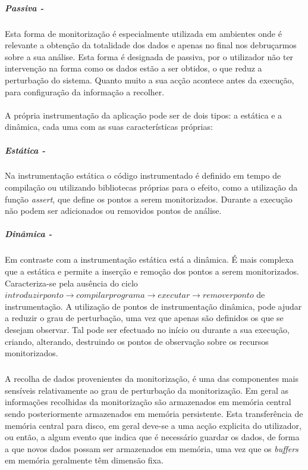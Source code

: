 \subparagraph*{Passiva - }
Esta forma de monitorização é especialmente utilizada em ambientes onde é relevante a obtenção da totalidade dos dados e apenas no final nos debruçarmos sobre a sua análise.
Esta forma é designada de passiva, por o utilizador não ter intervenção na forma como os dados estão a ser obtidos, o que reduz a perturbação do sistema.
Quanto muito a sua acção acontece antes da execução, para configuração da informação a recolher.

\paragraph*{}
A própria instrumentação da aplicação pode ser de dois tipos: a estática e a dinâmica, cada uma com as suas características próprias:

\subparagraph*{Estática - }

Na instrumentação estática o código instrumentado é definido em tempo de compilação ou utilizando bibliotecas próprias para o efeito, como a utilização da função \textit{assert}, que define os pontos a serem monitorizados.
Durante a execução não podem ser adicionados ou removidos pontos de análise.

\subparagraph*{Dinâmica - }

Em contraste com a instrumentação estática está a dinâmica.
É mais complexa que a estática e permite a inserção e remoção dos pontos a serem monitorizados.
Caracteriza-se pela ausência do ciclo $introduzir ponto\rightarrow compilar programa\rightarrow executar\rightarrow remover ponto$ de instrumentação.
A utilização de pontos de instrumentação dinâmica, pode ajudar a reduzir o grau de perturbação, uma vez que apenas são definidos os que se desejam observar.
Tal pode ser efectuado no início ou durante a sua execução, criando, alterando, destruindo os pontos de observação sobre os recursos monitorizados.


\subparagraph*{
}
A recolha de dados provenientes da monitorização, é uma das componentes mais sensíveis relativamente ao grau de perturbação da monitorização.
Em geral as informações recolhidas da monitorização são armazenados em memória central sendo posteriormente armazenados em memória persistente.
Esta transferência de memória central para disco, em geral deve-se a uma acção explicita do utilizador, ou então, a algum evento que indica que é necessário guardar os dados, de forma a que novos dados possam ser armazenados em memória, uma vez que os \textit{buffers} em memória geralmente têm dimensão fixa.

